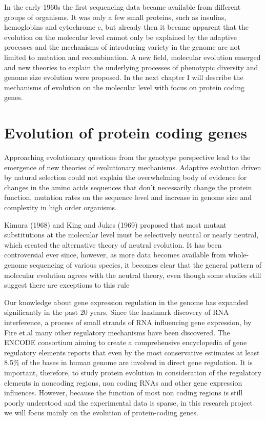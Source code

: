 \documentclass[11pt, a4paper,oneside]{report}
\begin{document}
In the early 1960s the first sequencing data became available from different groups of organisms. It was only a few small proteins, such as insulins\cite{Sanger1945}, hemoglobins\cite{INGRAM1956} and cytochrome c, but already then it became apparent that the evolution on the molecular level cannot only be explained by the adaptive processes\cite{King1969} and the mechanisms of introducing variety in the genome are not limited to mutation and recombination. A new field, molecular evolution emerged and new theories to explain the underlying processes of phenotypic diversity and genome size evolution were proposed.  In the next chapter I will describe the mechanisms of evolution on the molecular level with focus on protein coding genes. 


\section{Evolution of protein coding genes}
 Approaching evolutionary questions from the genotype perspective lead to the emergence of new theories of evolutionary mechanisms. Adaptive evolution driven by natural selection could not explain the overwhelming body of evidence for changes in the amino acids sequences that don't necessarily change the protein function, mutation rates on the sequence level and increase in genome size and complexity in high order organisms. 
 
 Kimura (1968)\cite{Kimura1968} and King and Jukes (1969)\cite{King1969} proposed that most mutant substitutions at the molecular level must be selectively neutral or nearly neutral, which created the alternative theory of neutral evolution. It has been controversial ever since, however, as more data becomes available from whole-genome sequencing of various species, it becomes clear that the general pattern of molecular evolution agrees with the neutral theory, even though some studies still suggest there are exceptions to this rule\cite{Haygood2007,Nielsen2007,Akey2009}  

Our knowledge about gene expression regulation in the genome has expanded significantly in the past 20 years. Since the landmark discovery of RNA interference, a process of small strands of RNA influencing gene expression, by Fire et.al \cite{Fire1998} many other regulatory mechanisms have been discovered.  The ENCODE consortium aiming to create a comprehensive encyclopedia of gene regulatory elements reports that even by the most conservative estimates at least 8.5\% of the bases in human genome are involved in direct gene regulation\cite{Bernstein2012}.  It is important, therefore, to study protein evolution in consideration of the regulatory elements in noncoding regions, non coding RNAs and other gene expression influences. However, because the function of most non coding regions is still poorly understood and the experimental data is sparse, in this research project we will focus mainly on the evolution of protein-coding genes. 
\end{document}
